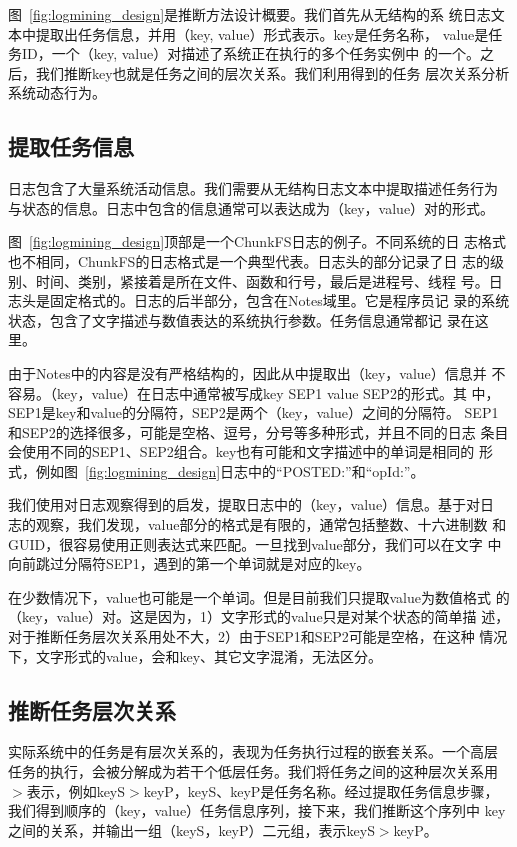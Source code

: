 图~\ref{fig:logmining_design}是推断方法设计概要。我们首先从无结构的系
统日志文本中提取出任务信息，并用（key, value）形式表示。key是任务名称，
value是任务ID，一个（key, value）对描述了系统正在执行的多个任务实例中
的一个。之后，我们推断key也就是任务之间的层次关系。我们利用得到的任务
层次关系分析系统动态行为。

\subsection{提取任务信息}

日志包含了大量系统活动信息。我们需要从无结构日志文本中提取描述任务行为
与状态的信息。日志中包含的信息通常可以表达成为（key，value）对的形式。

图~\ref{fig:logmining_design}顶部是一个ChunkFS日志的例子。不同系统的日
志格式也不相同，ChunkFS的日志格式是一个典型代表。日志头的部分记录了日
志的级别、时间、类别，紧接着是所在文件、函数和行号，最后是进程号、线程
号。日志头是固定格式的。日志的后半部分，包含在Notes域里。它是程序员记
录的系统状态，包含了文字描述与数值表达的系统执行参数。任务信息通常都记
录在这里。

由于Notes中的内容是没有严格结构的，因此从中提取出（key，value）信息并
不容易。（key，value）在日志中通常被写成key SEP1 value SEP2的形式。其
中，SEP1是key和value的分隔符，SEP2是两个（key，value）之间的分隔符。
SEP1和SEP2的选择很多，可能是空格、逗号，分号等多种形式，并且不同的日志
条目会使用不同的SEP1、SEP2组合。key也有可能和文字描述中的单词是相同的
形式，例如图~\ref{fig:logmining_design}日志中的“POSTED:”和“opId:”。

我们使用对日志观察得到的启发，提取日志中的（key，value）信息。基于对日
志的观察，我们发现，value部分的格式是有限的，通常包括整数、十六进制数
和GUID，很容易使用正则表达式来匹配。一旦找到value部分，我们可以在文字
中向前跳过分隔符SEP1，遇到的第一个单词就是对应的key。

在少数情况下，value也可能是一个单词。但是目前我们只提取value为数值格式
的（key，value）对。这是因为，1）文字形式的value只是对某个状态的简单描
述，对于推断任务层次关系用处不大，2）由于SEP1和SEP2可能是空格，在这种
情况下，文字形式的value，会和key、其它文字混淆，无法区分。

\subsection{推断任务层次关系}

实际系统中的任务是有层次关系的，表现为任务执行过程的嵌套关系。一个高层
任务的执行，会被分解成为若干个低层任务。我们将任务之间的这种层次关系用
$>$表示，例如keyS$>$keyP，keyS、keyP是任务名称。经过提取任务信息步骤，
我们得到顺序的（key，value）任务信息序列，接下来，我们推断这个序列中
key之间的关系，并输出一组（keyS，keyP）二元组，表示keyS$>$keyP。

